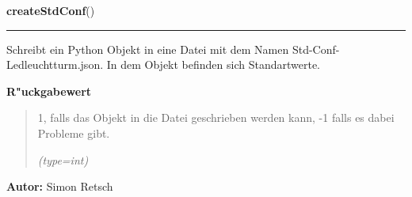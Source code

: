 \hspace{.8\funcindent}\begin{boxedminipage}{\funcwidth}

    \raggedright \textbf{createStdConf}()

    \vspace{-1.5ex}

    \rule{\textwidth}{0.5\fboxrule}
\setlength{\parskip}{2ex}
    Schreibt ein Python Objekt in eine Datei mit dem Namen 
    Std-Conf-Ledleuchtturm.json. In dem Objekt befinden sich Standartwerte.

\setlength{\parskip}{1ex}
      \textbf{R"uckgabewert}
    \vspace{-1ex}

      \begin{quote}
      1, falls das Objekt in die Datei geschrieben werden kann, -1 falls es
      dabei Probleme gibt.

      {\it (type=int)}

      \end{quote}

\textbf{Autor:} Simon Retsch



    \end{boxedminipage}

    \label{ledleuchtturm:fileFunc:getJsonFileObject}

    \vspace{0.5ex}

